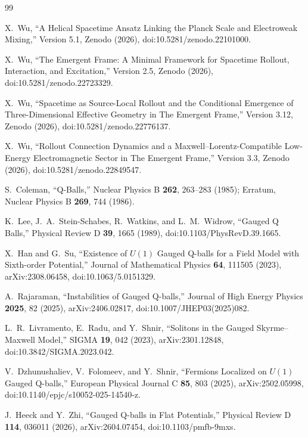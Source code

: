 \documentclass[11pt]{article}
\begin{document}
\begingroup
\small
\raggedright
\begin{thebibliography}{99}

X.~Wu,
``A Helical Spacetime Ansatz Linking the Planck Scale and Electroweak Mixing,''
Version 5.1, Zenodo (2026),
doi:10.5281/zenodo.22101000.

X.~Wu,
``The Emergent Frame: A Minimal Framework for Spacetime Rollout, Interaction, and Excitation,''
Version 2.5, Zenodo (2026),
doi:10.5281/zenodo.22723329.

X.~Wu,
``Spacetime as Source-Local Rollout and the Conditional Emergence of Three-Dimensional Effective Geometry in The Emergent Frame,''
Version 3.12, Zenodo (2026),
doi:10.5281/zenodo.22776137.

X.~Wu,
``Rollout Connection Dynamics and a Maxwell--Lorentz-Compatible Low-Energy Electromagnetic Sector in The Emergent Frame,''
Version 3.3, Zenodo (2026),
doi:10.5281/zenodo.22849547.

S.~Coleman,
``Q-Balls,''
Nuclear Physics B \textbf{262}, 263--283 (1985);
Erratum, Nuclear Physics B \textbf{269}, 744 (1986).

K.~Lee, J.~A.~Stein-Schabes, R.~Watkins, and L.~M.~Widrow,
``Gauged Q Balls,''
Physical Review D \textbf{39}, 1665 (1989),
doi:10.1103/PhysRevD.39.1665.

X.~Han and G.~Su,
``Existence of \(U(1)\) Gauged Q-balls for a Field Model with Sixth-order Potential,''
Journal of Mathematical Physics \textbf{64}, 111505 (2023),
arXiv:2308.06458,
doi:10.1063/5.0151329.

A.~Rajaraman,
``Instabilities of Gauged Q-balls,''
Journal of High Energy Physics \textbf{2025}, 82 (2025),
arXiv:2406.02817,
doi:10.1007/JHEP03(2025)082.

L.~R.~Livramento, E.~Radu, and Y.~Shnir,
``Solitons in the Gauged Skyrme--Maxwell Model,''
SIGMA \textbf{19}, 042 (2023),
arXiv:2301.12848,
doi:10.3842/SIGMA.2023.042.

V.~Dzhunushaliev, V.~Folomeev, and Y.~Shnir,
``Fermions Localized on \(U(1)\) Gauged Q-balls,''
European Physical Journal C \textbf{85}, 803 (2025),
arXiv:2502.05998,
doi:10.1140/epjc/s10052-025-14540-z.

J.~Heeck and Y.~Zhi,
``Gauged Q-balls in Flat Potentials,''
Physical Review D \textbf{114}, 036011 (2026),
arXiv:2604.07454,
doi:10.1103/pmfb-9mxs.


\end{thebibliography}
\end{document}
